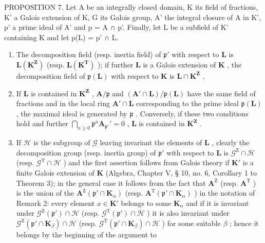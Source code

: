 PROPOSITION 7. Let A be an integrally closed domain, K its field of fractions, K' a Galois extension of K, G its Galois group, A' the integral closure of A in K', p' a prime ideal of A' and p = A ∩ p'. Finally, let L be a subfield of K' containing K and let p(L) = p' ∩ L.

\begin{enumerate}
\def\labelenumi{(\roman{enumi})}
\item
  The decomposition field (resp. inertia field) of \(\mathfrak{p}'\) with respect to \(\mathbf{L}\) is \(\mathbf{L}(\mathbf{K}^{\mathbf{Z}})\) (resp. \(\mathbf{L}(\mathbf{K}^{\mathbf{T}})\) ); if further \(\mathbf{L}\) is a Galois extension of \(\mathbf{K}\) , the decomposition field of \(\mathfrak{p}(\mathbf{L})\) with respect to \(\mathbf{K}\) is \(\mathbf{L} \cap \mathbf{K}^{\mathbf{Z}}\) .
\item
  If \(\mathbf{L}\) is contained in \(\mathbf{K}^{\mathbf{Z}}\) , \(\mathbf{A} / \mathfrak{p}\) and \((\mathbf{A}' \cap \mathbf{L}) / \mathfrak{p}(\mathbf{L})\) have the same field of fractions and in the local ring \(\mathbf{A}' \cap \mathbf{L}\) corresponding to the prime ideal \(\mathfrak{p}(\mathbf{L})\) , the maximal ideal is generated by \(\mathfrak{p}\) . Conversely, if these two conditions hold and further \(\bigcap_{n \geqslant 0} \mathfrak{p}^{n} \mathbf{A}_{\mathfrak{p}'}' = 0\) , \(\mathbf{L}\) is contained in \(\mathbf{K}^{\mathbf{Z}}\) .
\item
  If \(\mathcal{H}\) is the subgroup of \(\mathcal{G}\) leaving invariant the elements of \(\mathbf{L}\) , clearly the decomposition group (resp. inertia group) of \(\mathfrak{p}'\) with respect to \(\mathbf{L}\) is \(\mathcal{G}^{\mathrm{Z}}\cap \mathcal{H}\) (resp. \(\mathcal{G}^{\mathrm{T}}\cap \mathcal{H}\) ) and the first assertion follows from Galois theory if \(\mathbf{K}'\) is a finite Galois extension of \(\mathbf{K}\) (Algebra, Chapter V, § 10, no. 6, Corollary 1 to Theorem 3); in the general case it follows from the fact that \(\mathbf{A}^{\mathrm{Z}}\) (resp. \(\mathbf{A}^{\mathrm{T}}\) ) is the union of the \(\mathbf{A}^{\mathrm{Z}}(\mathfrak{p}'\cap \mathbf{K}_{\alpha})\) (resp. \(\mathbf{A}^{\mathrm{T}}(\mathfrak{p}'\cap \mathbf{K}_{\alpha})\) ) in the notation of Remark 2: every element \(x\in \mathbf{K}'\) belongs to some \(\mathbf{K}_{\alpha}\) and if it is invariant under \(\mathcal{G}^{\mathrm{Z}}(\mathfrak{p}')\cap \mathcal{H}\) (resp. \(\mathcal{G}^{\mathrm{T}}(\mathfrak{p}')\cap \mathcal{H}\) ) it is also invariant under \(\mathcal{G}^{\mathrm{Z}}(\mathfrak{p}'\cap \mathbf{K}_{\beta})\cap \mathcal{H}\) (resp. \(\mathcal{G}^{\mathrm{T}}(\mathfrak{p}'\cap \mathbf{K}_{\beta})\cap \mathcal{H}\) ) for some suitable \(\beta\) ; hence it belongs by the beginning of the argument to
\end{enumerate}

